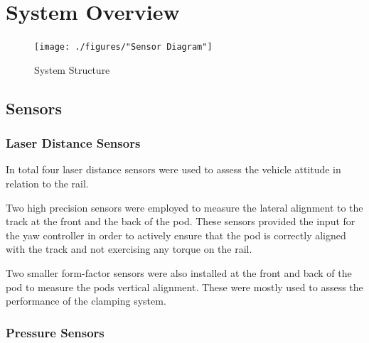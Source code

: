 
\chapter{System Overview}

\begin{figure}[H]
  \centering \texttt{[image: ./figures/"Sensor Diagram"]}
  \caption{System Structure}
\end{figure}

\section{Sensors}

\subsection{Laser Distance Sensors}

In total four laser distance sensors were used to assess the vehicle attitude in relation to the rail.

Two high precision sensors were employed to measure the lateral alignment to the track at the front and the back of the pod. These sensors provided the input for the yaw controller in order to actively ensure that the pod is correctly aligned with the track and not exercising any torque on the rail.

Two smaller form-factor sensors were also installed at the front and back of the pod to measure the pods vertical alignment. These were mostly used to assess the performance of the clamping system.

\subsection{Pressure Sensors}

